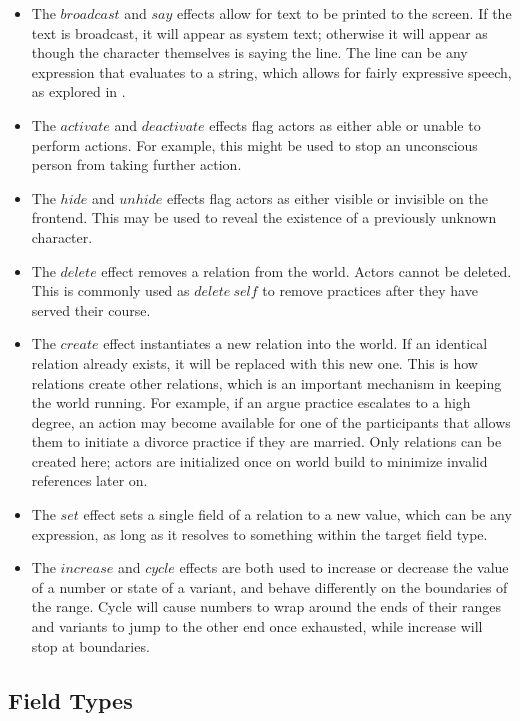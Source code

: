 \begin{itemize}
    \item The $broadcast$ and $say$ effects allow for text to be printed to the screen.
    If the text is broadcast, it will appear as system text; otherwise it will appear
    as though the character themselves is saying the line. The line can be any expression
    that evaluates to a string, which allows for fairly expressive speech, as explored
    in .
    \item The $activate$ and $deactivate$ effects flag actors as either able or unable
    to perform actions. For example, this might be used to stop an unconscious person
    from taking further action.
    \item The $hide$ and $unhide$ effects flag actors as either visible or invisible
    on the frontend. This may be used to reveal the existence of a previously unknown
    character.
    \item The $delete$ effect removes a relation from the world. Actors cannot be deleted.
    This is commonly used as $delete\ self$ to remove practices after they have served
    their course.
    \item The $create$ effect instantiates a new relation into the world. If an identical
    relation already exists, it will be replaced with this new one. This is how relations
    create other relations, which is an important mechanism in keeping the world running.
    For example, if an argue practice escalates to a high degree, an action may become
    available for one of the participants that allows them to initiate a divorce
    practice if they are married. Only relations can be created here; actors are initialized
    once on world build to minimize invalid references later on.
    \item The $set$ effect sets a single field of a relation to a new value, which can be
    any expression, as long as it resolves to something within the target field type.
    \item The $increase$ and $cycle$ effects are both used to increase or decrease the
    value of a number or state of a variant, and behave differently on the boundaries of
    the range. Cycle will cause numbers to wrap around the ends of their ranges and variants
    to jump to the other end once exhausted, while increase will stop at boundaries.
\end{itemize}

\subsection{Field Types}

